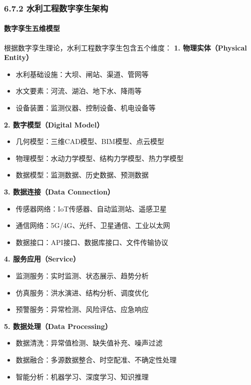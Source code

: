 {{{{{{{{{{\subsubsection{6.7.2 水利工程数字孪生架构}\label{ux6c34ux5229ux5de5ux7a0bux6570ux5b57ux5b6aux751fux67b6ux6784}
\paragraph{数字孪生五维模型}\label{ux6570ux5b57ux5b6aux751fux4e94ux7ef4ux6a21ux578b} 根据数字孪生理论，水利工程数字孪生包含五个维度： \textbf{1.
物理实体（Physical Entity）} \begin{itemize} \tightlist \item 水利基础设施：大坝、闸站、渠道、管网等 \item 水文要素：河流、湖泊、地下水、降雨等 \item
设备装置：监测仪器、控制设备、机电设备等 \end{itemize} \textbf{2. 数字模型（Digital Model）} \begin{itemize} \tightlist \item
几何模型：三维CAD模型、BIM模型、点云模型 \item 物理模型：水动力学模型、结构力学模型、热力学模型 \item 数据模型：监测数据、历史数据、预测数据 \end{itemize} \textbf{3. 数据连接（Data
Connection）} \begin{itemize} \tightlist \item 传感器网络：IoT传感器、自动监测站、遥感卫星 \item 通信网络：5G/4G、光纤、卫星通信、工业以太网 \item
数据接口：API接口、数据库接口、文件传输协议 \end{itemize} \textbf{4. 服务应用（Service）} \begin{itemize} \tightlist \item 监测服务：实时监测、状态展示、趋势分析
\item 仿真服务：洪水演进、结构分析、调度优化 \item 预警服务：异常检测、风险评估、应急响应 \end{itemize} \textbf{5. 数据处理（Data Processing）} \begin{itemize}
\tightlist \item 数据清洗：异常值检测、缺失值补充、噪声过滤 \item 数据融合：多源数据整合、时空配准、不确定性处理 \item 智能分析：机器学习、深度学习、知识推理 \end{itemize}
}}}}}}}}}}
